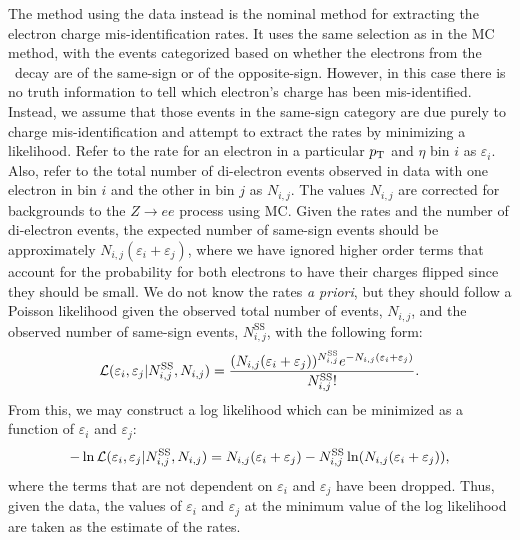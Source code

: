 The method using the data instead is the nominal method 
for extracting the electron charge mis-identification
rates.
It uses the same selection as in the MC method, with the events
categorized based on whether the electrons from the \z~decay 
are of the same-sign or of the opposite-sign.
However, in this case
there is no truth information to tell which electron's charge
has been mis-identified. Instead, we assume that those events in
the same-sign category are due purely to charge mis-identification
and attempt to extract the rates by minimizing a likelihood.
Refer to the rate for an electron in a 
particular $p_{\mathrm{T}}$ and $\eta$ bin $i$ as $\varepsilon_i$.
Also, refer to the total number of di-electron events observed in data with one electron
in bin $i$ and the other in bin $j$ as $N_{i,j}$. The values $N_{i,j}$
are corrected for backgrounds to the $Z\to ee$ process using MC.
Given the rates and the number of di-electron events, 
the expected number of same-sign events
should be approximately $N_{i,j}(\varepsilon_i + \varepsilon_j)$,
where we have ignored higher order terms that account for  
the probability for both electrons to have their
charges flipped since they should be small. We do
not know the rates \emph{a priori}, but they should follow 
a Poisson likelihood given the observed total number of events,
$N_{i,j}$, and the observed number of same-sign events,
$N_{i,j}^{\textrm{SS}}$, with the following form:
\begin{equation}
\mathcal{L}( \varepsilon_i,\varepsilon_j | N_{i,j}^{\textrm{SS}},N_{i,j})
=
\frac{(N_{i,j}(\varepsilon_i+\varepsilon_j))^{N^{\textrm{SS}}_{i,j}} e^{-N_{i,j}(\varepsilon_i+\varepsilon_j)}}{N^{\textrm{SS}}_{i,j}!}.
\end{equation}
From this, we may construct a log likelihood which can be minimized
as a function of $\varepsilon_i$ and $\varepsilon_j$:
\begin{equation}
-\ln \mathcal{L}( \varepsilon_i,\varepsilon_j | N_{i,j}^{\textrm{SS}},N_{i,j}) = 
N_{i,j}(\varepsilon_i+\varepsilon_j)
- N^{\textrm{SS}}_{i,j} \ln(N_{i,j}(\varepsilon_i+\varepsilon_j)),
\end{equation}
where the terms that are not dependent on $\varepsilon_i$
and $\varepsilon_j$ have been dropped.
Thus, given the data, the values of $\varepsilon_i$ and $\varepsilon_j$
at the minimum value of the log likelihood are taken as the estimate
of the rates.

